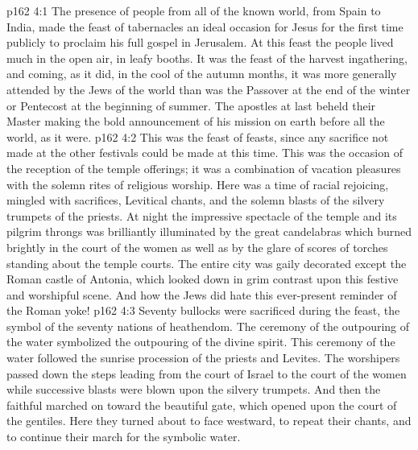 \vs p162 4:1 The presence of people from all of the known world, from Spain to India, made the feast of tabernacles an ideal occasion for Jesus for the first time publicly to proclaim his full gospel in Jerusalem. At this feast the people lived much in the open air, in leafy booths. It was the feast of the harvest ingathering, and coming, as it did, in the cool of the autumn months, it was more generally attended by the Jews of the world than was the Passover at the end of the winter or Pentecost at the beginning of summer. The apostles at last beheld their Master making the bold announcement of his mission on earth before all the world, as it were.
\vs p162 4:2 This was the feast of feasts, since any sacrifice not made at the other festivals could be made at this time. This was the occasion of the reception of the temple offerings; it was a combination of vacation pleasures with the solemn rites of religious worship. Here was a time of racial rejoicing, mingled with sacrifices, Levitical chants, and the solemn blasts of the silvery trumpets of the priests. At night the impressive spectacle of the temple and its pilgrim throngs was brilliantly illuminated by the great candelabras which burned brightly in the court of the women as well as by the glare of scores of torches standing about the temple courts. The entire city was gaily decorated except the Roman castle of Antonia, which looked down in grim contrast upon this festive and worshipful scene. And how the Jews did hate this ever\hyp{}present reminder of the Roman yoke!
\vs p162 4:3 Seventy bullocks were sacrificed during the feast, the symbol of the seventy nations of heathendom. The ceremony of the outpouring of the water symbolized the outpouring of the divine spirit. This ceremony of the water followed the sunrise procession of the priests and Levites. The worshipers passed down the steps leading from the court of Israel to the court of the women while successive blasts were blown upon the silvery trumpets. And then the faithful marched on toward the beautiful gate, which opened upon the court of the gentiles. Here they turned about to face westward, to repeat their chants, and to continue their march for the symbolic water.
